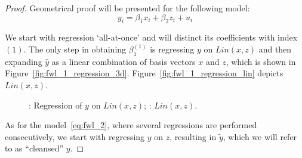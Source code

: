 \documentclass[nobib]{tufte-handout}
\begin{document}
\begin{proof}
Geometrical proof will be presented for the following model:
\begin{equation} \label{eq:fwl_proof}
y_i = \beta_1 x_i + \beta_2 z_i + u_i
\end{equation}

We start with regression `all-at-once' and will distinct its coefficients with index $(1)$. The only step in obtaining $\beta_1^{(1)}$ is regressing $y$ on $Lin(x,z)$ and then expanding $\hat y$ as a linear combination of basis vectors $x$ and $z$,
which is shown in Figure~\ref{fig:fwl_1_regression_3d}. Figure~\ref{fig:fwl_1_regression_lin} depicts $Lin(x, z)$.

\begin{figure}[ht!]
\begin{center}
\hspace{4ex}
\caption{: Regression of $y$ on $Lin(x,z)$; : $Lin(x, z)$.}
\end{center}
\end{figure}

As for the model~\ref{eq:fwl_2}, where several regressions are performed consecutively, we start with regressing $y$ on $z$, resulting in $\tilde{y}$, which we will refer to as ``cleansed'' $y$.


\end{proof}
\end{document}

